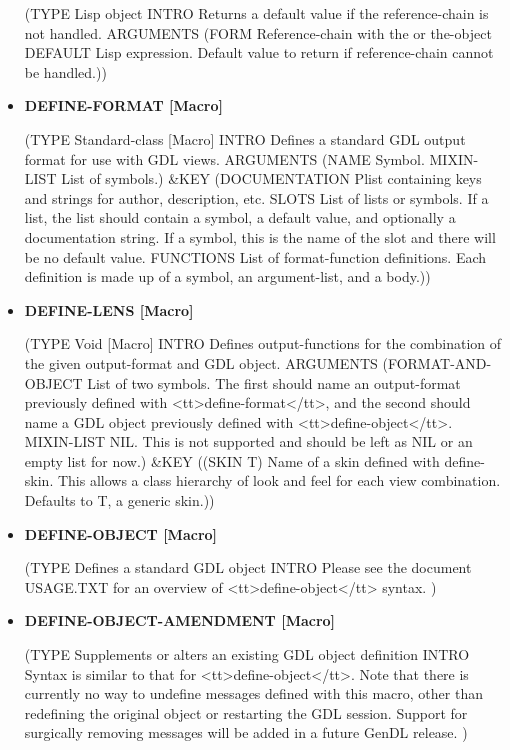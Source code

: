 \documentclass [11pt]{book}
\begin{document}
\begin{itemize}
(TYPE Lisp object INTRO  Returns a default value if the reference-chain is not handled.
 ARGUMENTS (FORM Reference-chain with the or the-object DEFAULT Lisp expression. Default value to return if reference-chain cannot be handled.))



\item {}
\label{prim:define-format}
\textbf{DEFINE-FORMAT [Macro]}

(TYPE Standard-class [Macro] INTRO  Defines a standard GDL output format for use with GDL views.
 ARGUMENTS (NAME Symbol. MIXIN-LIST List of symbols.) \&KEY (DOCUMENTATION Plist containing keys and strings for author, description, etc. SLOTS List of lists or symbols. If a list, the list should contain a symbol, a default value, and optionally a documentation string. If
a symbol, this is the name of the slot and there will be no default value. FUNCTIONS List of format-function definitions. Each definition is made up of a symbol, an argument-list, and a body.))



\item {}
\label{prim:define-lens}
\textbf{DEFINE-LENS [Macro]}

(TYPE Void [Macro] INTRO  Defines output-functions for the combination of the given output-format and GDL object.
 ARGUMENTS (FORMAT-AND-OBJECT List of two symbols. The first should name an output-format previously 
defined with <tt>define-format</tt>, and the second should name a GDL object previously defined with <tt>define-object</tt>. MIXIN-LIST NIL. This is not supported and should be left as NIL or an empty list for now.) \&KEY ((SKIN T) Name of a skin defined with define-skin. This allows a class hierarchy of look and feel for each view combination. Defaults to T, a generic skin.))



\item {}
\label{prim:define-object}
\textbf{DEFINE-OBJECT [Macro]}

(TYPE Defines a standard GDL object INTRO  Please see the document USAGE.TXT for an
overview of <tt>define-object</tt> syntax.
)



\item {}
\label{prim:define-object-amendment}
\textbf{DEFINE-OBJECT-AMENDMENT [Macro]}

(TYPE Supplements or alters an existing GDL object definition INTRO  Syntax is similar to that for <tt>define-object</tt>.
Note that there is currently no way to undefine messages defined with this macro, other than redefining the
original object or restarting the GDL session. Support for surgically removing messages will be added in a
future GenDL release.
)




\end{itemize}
\end{document}
